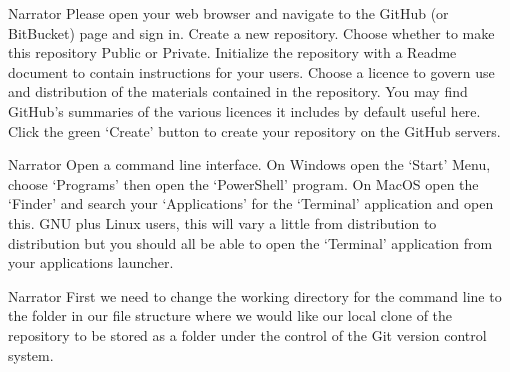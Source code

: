 \documentclass{screenplay} %
\begin{document}
\begin{dialogue}{Narrator} Please open your web browser and navigate to the GitHub (or BitBucket) page and sign in.
\newline
\newline
Create a new repository.
\newline
\newline
Choose whether to make this repository Public or Private.
\newline
\newline
Initialize the repository with a Readme document to contain instructions for your users.
\newline
\newline
Choose a licence to govern use and distribution of the materials contained in the repository.
You may find GitHub's summaries of the various licences it includes by default useful here.
\newline
\newline
Click the green `Create' button to create your repository on the GitHub servers.
\end{dialogue}



\begin{dialogue}{Narrator}
Open a command line interface.
\newline
\newline
On Windows open the `Start' Menu, choose `Programs' then open the `PowerShell' program.
\newline
\newline
On MacOS open the `Finder' and search your `Applications' for the `Terminal' application and open this.
\newline
\newline
GNU plus Linux users, this will vary a little from distribution to distribution but you should all be able to open the `Terminal' application from your applications launcher.
\end{dialogue}

\begin{dialogue}{Narrator}
First we need to change the working directory for the command line to the folder in our file structure where we would like our local clone of the repository to be stored as a folder under the control of the Git version control system.
\end{dialogue}
\end{document}
